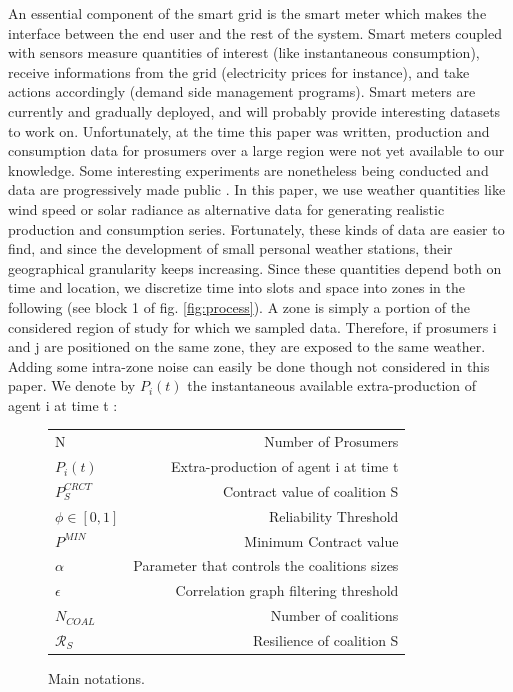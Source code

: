 \documentclass[journal]{IEEEtran}
\begin{document}
An essential component of the smart grid is the smart meter which makes the interface between the end user and the rest of the system. Smart meters coupled with sensors measure quantities of interest (like instantaneous consumption), receive informations from the grid (electricity prices for instance), and take actions accordingly (demand side management programs). Smart meters are currently and gradually deployed, and will probably provide interesting datasets to work on. Unfortunately, at the time this paper was written, production and consumption data for prosumers over a large region were not yet available to our knowledge. Some interesting experiments are nonetheless being conducted and data are progressively made public \cite{ISSDA}. In this paper, we use weather quantities like wind speed or solar radiance as alternative data for generating realistic production and consumption series. Fortunately, these kinds of data are easier to find, and since the development of small personal weather stations, their geographical granularity keeps increasing.  Since these quantities depend both on time and location, we discretize time into slots and space into zones in the following (see block 1 of fig. \ref{fig:process}). A zone is simply a portion of the considered region of study for which we sampled data. Therefore, if prosumers i and j are positioned on the same zone, they are exposed to the same weather. Adding some intra-zone noise can easily be done though not considered in this paper. We denote by $ P_{i}(t) $ the instantaneous available extra-production of agent i at time t :

\begin{figure}
\label{tab:main_notations}
	\begin{tabular}{ | l | r | }
   						N & Number of Prosumers \\
  						$ P_i(t) $ & Extra-production of agent i at time t \\
   						$ P_S^{CRCT} $ & Contract value of coalition S \\
   						$ \phi \in \left[ 0,1 \right] $ & Reliability Threshold \\
   						$ P^{MIN} $ & Minimum Contract value \\
   						$ \alpha $ & Parameter that controls the coalitions sizes \\
   						$ \epsilon $ & Correlation graph filtering threshold \\
   						$ N_{COAL} $ & Number of coalitions \\
   						$ \mathcal{R}_S $ & Resilience of coalition S
 	\end{tabular}
 	\caption{Main notations.}
\end{figure}
\end{document}
